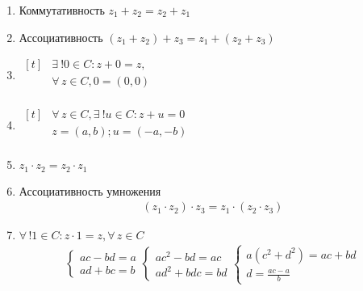 \documentclass[14pt, a4paper]{report}
\let\oldforall\forall
\renewcommand{\forall}{\oldforall \, }
\let\oldexist\exists
\renewcommand{\exists}{\oldexist \: }
\begin{document}
\begin{enumerate}
    \item Коммутативность $z_1 + z_2 = z_2 + z_1$
    \item Ассоциативность $(z_1 + z_2) + z_3 = z_1 + (z_2 + z_3)$
    \item 
        $
        \begin{aligned}[t]
            & \exists ! 0 \in C : z + 0 = z, &\\
            & \forall z \in C, 0 = (0, 0) &\\
        \end{aligned}
        $
    \item
        $
        \begin{aligned}[t]
            & \forall z \in C, \exists! u \in C : z + u = 0 &\\
            & z = (a, b); u = (-a, -b) &\\
        \end{aligned}
        $
    \item $z_1 \cdot z_2 = z_2 \cdot z_1$
    \item Ассоциативность умножения
        \begin{align*}
            (z_1 \cdot z_2) \cdot z_3 = z_1 \cdot (z_2 \cdot z_3)
        \end{align*}
    \item $\forall! 1 \in C : z \cdot 1 = z, \forall z \in C$
        \begin{align*}
            \begin{cases}
                ac - bd = a \\
                ad + bc = b
            \end{cases}
            \begin{cases}
                ac^2 - bd = ac \\
                ad^2 + bdc = bd
            \end{cases}
            \begin{cases}
            a(c^2 + d^2) = ac + bd \\
            d = \frac{ac - a}{b}
        \end{cases}
        \end{align*}
\end{enumerate}
\end{document}
